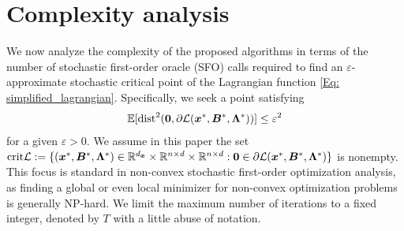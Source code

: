 \section{Complexity analysis}
\label{Section: Convergence analysis}
We now analyze the complexity of the proposed algorithms in terms of the number of stochastic first-order oracle (SFO) calls required to find an $\varepsilon$-approximate stochastic critical point of the Lagrangian function \eqref{Eq: simplified_lagrangian}. Specifically, we seek a point satisfying 
\begin{equation}\label{equ:esp}
\mathbb{E} [\text{dist}^2(\bm{0}, \partial \mathcal{L} (\bm{x}^*, \bm{B}^*, \bm{\Lambda}^* ))] \leq \varepsilon^2
\end{equation}
for a given \(\varepsilon > 0\). We assume in this paper the set \(
\text{crit} \mathcal{L} := \{(\bm{x}^*, \bm{B}^*, \bm{\Lambda}^* ) \in \mathbb{R}^{d_{\bm{x}}} \times \mathbb{R}^{n\times d} \times \mathbb{R}^{n\times d}: \bm{0} \in \partial \mathcal{L}(\bm{x}^*, \bm{B}^*, \bm{\Lambda}^*)\}
\) is nonempty. This focus is standard in non-convex stochastic first-order optimization analysis, as finding a global or even local minimizer for non-convex optimization problems is generally NP-hard. We limit the maximum number of iterations to a fixed integer, denoted by $T$ with a little abuse of notation.

